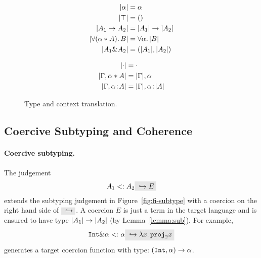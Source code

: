 \begin{figure}[!t]
\begin{spacing}{0.5}
\begin{minipage}[t]{.5\textwidth}

  \begin{align*}
    \lvert \alpha \rvert                &= \alpha \\
    \lvert \top \rvert                  &= () \\
    \lvert A_1 \to A_2 \rvert         &= \lvert A_1 \rvert \to \lvert A_2 \rvert \\
    \lvert \forall (\alpha * A).\, B \rvert  &= \forall \alpha.\, \lvert B \rvert \\
    \lvert A_1 \& A_2 \rvert      &= (\lvert A_1 \rvert, \lvert A_2 \rvert) \\
  \end{align*}
\end{minipage}
\begin{minipage}[t]{.5\textwidth}

  \begin{align*}
    \lvert \cdot \rvert                        &= \cdot \\
    \lvert \Gamma, \alpha * A \rvert &= \lvert \Gamma \rvert, \alpha \\
    \lvert \Gamma, \alpha \!:\! A \rvert   &= \lvert \Gamma \rvert, \alpha \!:\! \lvert A \rvert
  \end{align*}
\end{minipage}
\end{spacing}
  \caption{Type and context translation.}
  \label{fig:type-and-context-translation}
\end{figure}



\subsection{Coercive Subtyping and Coherence}

\paragraph{Coercive subtyping.}

The judgement
\[
A_1 \subtype A_2 \yields E
\]
extends the subtyping judgement in Figure~\ref{fig:fi-subtype} with a coercion
on the right hand side of $ \yields {} $. A coercion $ E $ is just a term
in the target language and is ensured to have type
$ \lvert A_1 \rvert \to \lvert A_2 \rvert $ (by Lemma~\ref{lemma:sub}). For example,
\[
\tyint \inter \alpha \subtype \alpha \yields {\lamty x {\im {\tyint \inter \tybool}} {\proj 2 x}}
\]
generates a target coercion function with type: $(\texttt{Int},\alpha) \to \alpha$.

